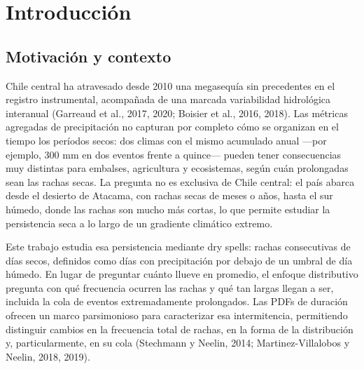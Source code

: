 \chapter{Introducción}\label{cap:1}

\section{Motivación y contexto}\label{sec:motivacion}

Chile central ha atravesado desde 2010 una megasequía sin precedentes en el registro instrumental, acompañada de una marcada variabilidad hidrológica interanual (Garreaud et al., 2017, 2020; Boisier et al., 2016, 2018). Las métricas agregadas de precipitación no capturan por completo cómo se organizan en el tiempo los períodos secos: dos climas con el mismo acumulado anual ---por ejemplo, 300 mm en dos eventos frente a quince--- pueden tener consecuencias muy distintas para embalses, agricultura y ecosistemas, según cuán prolongadas sean las rachas secas. La pregunta no es exclusiva de Chile central: el país abarca desde el desierto de Atacama, con rachas secas de meses o años, hasta el sur húmedo, donde las rachas son mucho más cortas, lo que permite estudiar la persistencia seca a lo largo de un gradiente climático extremo.

Este trabajo estudia esa persistencia mediante dry spells: rachas consecutivas de días secos, definidos como días con precipitación por debajo de un umbral de día húmedo. En lugar de preguntar cuánto llueve en promedio, el enfoque distributivo pregunta con qué frecuencia ocurren las rachas y qué tan largas llegan a ser, incluida la cola de eventos extremadamente prolongados. Las PDFs de duración ofrecen un marco parsimonioso para caracterizar esa intermitencia, permitiendo distinguir cambios en la frecuencia total de rachas, en la forma de la distribución y, particularmente, en su cola (Stechmann y Neelin, 2014; Martinez-Villalobos y Neelin, 2018, 2019).

